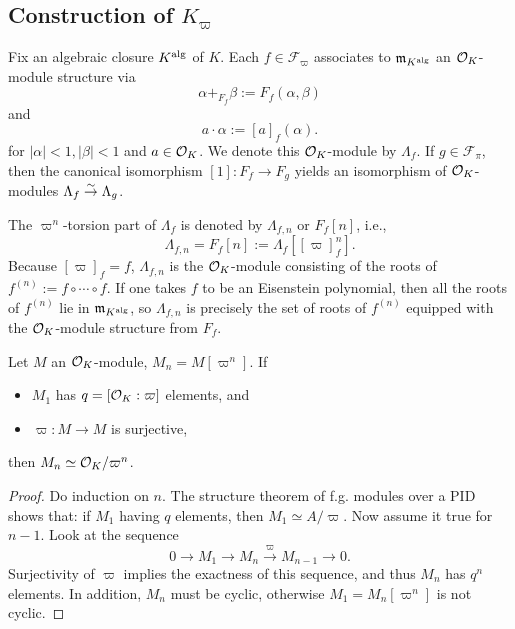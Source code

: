 \subsection{Construction of \texorpdfstring{$K_\varpi$}{}}
Fix an algebraic closure $K^{\mathrm{alg}}$ of $K$.
Each $f\in\mathcal{F}_\varpi$ associates to $\mathfrak{m}_{K^{\mathrm{alg}}}$ an $\mathcal{O}_K$-module structure via \[\alpha +_{F_f}\beta := F_f(\alpha, \beta)\]and
\[a\cdot \alpha := [a]_f(\alpha).\]for $|\alpha| < 1, |\beta| < 1$ and $a\in \mathcal{O}_K$.
We denote this $\mathcal{O}_K$-module by $\Lambda_f$.
If $g\in\mathcal{F}_\pi$, then the canonical isomorphism $[1] : F_f\to F_g$ yields an isomorphism of $\mathcal{O}_K$-modules $\Lambda_f\stackrel{\sim}{\rightarrow}\Lambda_g$.

The $\varpi^n$-torsion part of $\Lambda_f$ is denoted by $\Lambda_{f, n}$ or $F_f[n]$, i.e., \[\Lambda_{f, n} = F_f[n] := \Lambda_f[[\varpi]_f^n].\]
Because $[\varpi]_f = f$, $\Lambda_{f, n}$ is the $\mathcal{O}_K$-module consisting of the roots of $f^{(n)} := f\circ\cdots\circ f$.
If one takes $f$ to be an Eisenstein polynomial, then all the roots of $f^{(n)}$ lie in $\mathfrak{m}_{K^{\mathrm{alg}}}$, so $\Lambda_{f, n}$ is precisely the set of roots of $f^{(n)}$ equipped with the $\mathcal{O}_K$-module structure from $F_f$.

\begin{lemma}\label{pi^n torsion cyclic of}
    Let $M$ an $\mathcal{O}_K$-module, $M_n = M[\varpi^n]$. If\begin{itemize}
        \item $M_1$ has $q = [\mathcal{O}_K : \varpi]$ elements, and
        \item $\varpi : M \to M$ is surjective,
    \end{itemize}
    then $M_n\simeq \mathcal{O}_K/\varpi^n$.
\end{lemma}
\begin{proof}
    Do induction on $n$. The structure theorem of f.g.\! modules over a PID shows that:
    if $M_1$ having $q$ elements, then $M_1\simeq A/\varpi$.
    Now assume it true for $n-1$.
    Look at the sequence \[0\to M_1\to M_n\stackrel{\varpi}{\to} M_{n-1}\to 0.\] Surjectivity of $\varpi$ implies the exactness of this sequence, and thus $M_n$ has $q^n$ elements. In addition, $M_n$ must be cyclic, otherwise $M_1 = M_n[\varpi^n]$ is not cyclic.
\end{proof}

